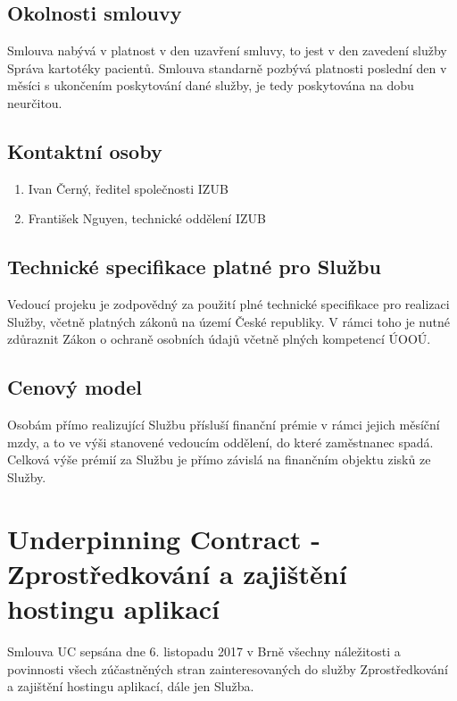 \documentclass[11pt, a4paper, titlepage]{article}
\begin{document}
	\subsection*{Okolnosti smlouvy}

	\noindent Smlouva nabývá v platnost v den uzavření smluvy, to jest v den zavedení služby Správa kartotéky pacientů. Smlouva standarně pozbývá platnosti poslední den v měsíci s ukončením poskytování dané služby, je tedy poskytována na dobu neurčitou.

	\subsection*{Kontaktní osoby}
	\begin{enumerate}
		\item Ivan Černý, ředitel společnosti IZUB
		\item František Nguyen, technické oddělení IZUB
	\end{enumerate}

	\subsection*{Technické specifikace platné pro Službu}

	Vedoucí projeku je zodpovědný za použití plné technické specifikace pro realizaci Služby, včetně platných zákonů na území České republiky. V rámci toho je nutné zdůraznit Zákon o ochraně osobních údajů včetně plných kompetencí ÚOOÚ.

	\subsection*{Cenový model}

	Osobám přímo realizující Službu přísluší finanční prémie v rámci jejich měsíční mzdy, a to ve výši stanovené vedoucím oddělení, do které zaměstnanec spadá. Celková výše prémií za Službu je přímo závislá na finančním objektu zisků ze Služby. 

	\section*{Underpinning Contract - Zprostředkování a zajištění hostingu aplikací}
	
	Smlouva UC sepsána dne 6. listopadu 2017 v Brně všechny náležitosti a povinnosti všech zúčastněných stran zainteresovaných do služby Zprostředkování a zajištění hostingu aplikací, dále jen Služba.
\end{document}
